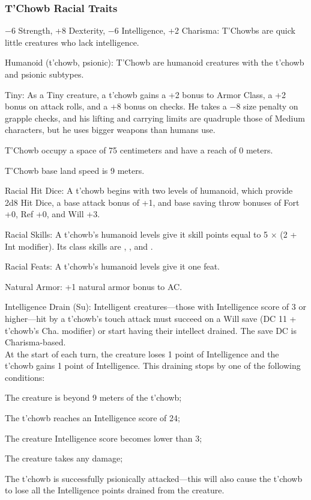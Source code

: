 \subsubsection{T'Chowb Racial Traits}
\begin{itemize*}
	\item $-6$ Strength, +8 Dexterity, $-6$ Intelligence, +2 Charisma: T'Chowbs are quick little creatures who lack intelligence.
    \item Humanoid (t'chowb, psionic): T'Chowb are humanoid creatures with the t'chowb and psionic subtypes.
	\item Tiny: As a Tiny creature, a t'chowb gains a +2 bonus to Armor Class, a +2 bonus on attack rolls, and a +8 bonus on  checks. He takes a $-8$ size penalty on grapple checks, and his lifting and carrying limits are quadruple those of Medium characters, but he uses bigger weapons than humans use.
    \item T'Chowb occupy a space of 75 centimeters and have a reach of 0 meters.
    \item T'Chowb base land speed is 9 meters.

    \item Racial Hit Dice: A t'chowb begins with two levels of humanoid, which provide 2d8 Hit Dice, a base attack bonus of +1, and base saving throw bonuses of Fort +0, Ref +0, and Will +3.
    \item Racial Skills: A t'chowb's humanoid levels give it skill points equal to 5 $\times$ (2 + Int modifier). Its class skills are , ,  and .
    \item Racial Feats: A t'chowb's humanoid levels give it one feat.

    \item Natural Armor: +1 natural armor bonus to AC.

    \item Intelligence Drain (Su): Intelligent creatures---those with Intelligence score of 3 or higher---hit by a t'chowb's touch attack must succeed on a Will save (DC 11 + t'chowb's Cha. modifier) or start having their intellect drained. The save DC is Charisma-based.\\

    At the start of each turn, the creature loses 1 point of Intelligence and the t'chowb gains 1 point of Intelligence. This draining stops by one of the following conditions:
    \begin{itemize*}
        \item The creature is beyond 9 meters of the t'chowb;
        \item The t'chowb reaches an Intelligence score of 24;
        \item The creature Intelligence score becomes lower than 3;
        \item The creature takes any damage;
        \item The t'chowb is successfully psionically attacked---this will also cause the t'chowb to lose all the Intelligence points drained from the creature.
    \end{itemize*}


\end{itemize*}
